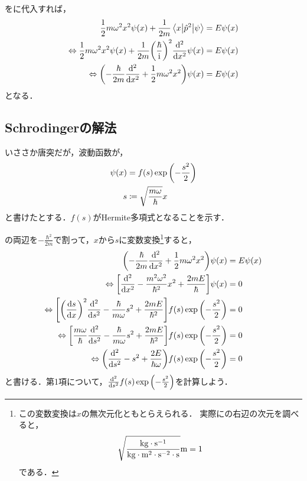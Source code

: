 \documentclass{report}
\begin{document}
    をに代入すれば，
    \begin{align}
      \frac{1}{2}m\omega^2x^2\psi(x) + \frac{1}{2m}\mel**{x}{\hat{p}^2}{\psi} &= E\psi(x) \\ 
      \Leftrightarrow \frac{1}{2}m\omega^2x^2\psi(x) + \frac{1}{2m}\qty(\frac{\hbar}{\mathrm{i}})^2\dv[2]{x}\psi(x) &= E\psi(x) \\ 
      \Leftrightarrow \qty(-\frac{\hbar}{2m}\dv[2]{x} + \frac{1}{2}m\omega^2x^2)\psi(x) &= E\psi(x)\label{schrodinger-eq-wave-func}
    \end{align}
    となる．
  \subsection{Schrodingerの解法}
    いささか唐突だが，波動函数が，
    \begin{align}
      \psi(x) &= f(s)\exp\qty(-\frac{s^2}{2}) \label{psi-fs}\\ 
      s &\coloneqq \sqrt{\frac{m\omega}{\hbar}}x\label{s-def}
    \end{align}
    と書けたとする．$f(s)$がHermite多項式となることを示す．
    \par
    の両辺を$-\frac{\hbar^2}{2m}$で割って，$x$から$s$に変数変換\footnote{
      この変数変換は$x$の無次元化ともとらえられる．
      実際にの右辺の次元を調べると，
      \begin{align*}
        \sqrt{\frac{\mathrm{kg\cdot s^{-1}}}{\mathrm{kg\cdot m^2\cdot s^{-2}\cdot s}}}\mathrm{m} = 1
      \end{align*}
      である．
    }すると，
    \begin{align}
      \qty(-\frac{\hbar}{2m}\dv[2]{x} + \frac{1}{2}m\omega^2x^2)\psi(x) &= E\psi(x) \\ 
      \Leftrightarrow \qty[\dv[2]{x} - \frac{m^2\omega^2}{\hbar^2}x^2 + \frac{2mE}{\hbar}]\psi(x) &= 0 \\ 
      \Leftrightarrow \qty[\qty(\dv{s}{x})^2\dv[2]{s} - \frac{\hbar}{m\omega}s^2 + \frac{2mE}{\hbar^2}]f(s)\exp\qty(-\frac{s^2}{2}) &= 0 \\ 
      \Leftrightarrow \qty[\frac{m\omega}{\hbar}\dv[2]{s} - \frac{\hbar}{m\omega}s^2 + \frac{2mE}{\hbar^2}]f(s)\exp\qty(-\frac{s^2}{2}) &= 0 \\ 
      \Leftrightarrow \qty(\dv[2]{s} - s^2 + \frac{2E}{\hbar\omega})f(s)\exp\qty(-\frac{s^2}{2}) &= 0 \label{before-hermite-polynominal}
    \end{align}
    と書ける．第1項について，$\dv[2]{s}f(s)\exp\qty(-\frac{s^2}{2})$を計算しよう．
\end{document}
